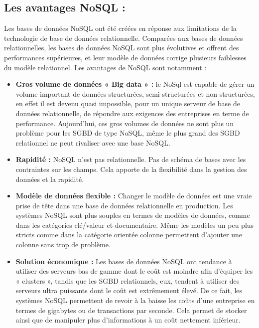 \subsection{Les avantages NoSQL : }
Les bases de données NoSQL ont été créées en réponse aux limitations de la technologie de base de données relationnelle. Comparées aux bases de données relationnelles, les bases de données NoSQL sont plus évolutives et offrent des performances supérieures, et leur modèle de données corrige plusieurs faiblesses du modèle relationnel. Les avantages de NoSQL sont notamment :

\begin{itemize}
\item \textbf{Gros volume de données « Big data » :} le NoSql est capable de gérer un volume important de données structurées, semi-structurées et non structurées, en effet il est devenu quasi impossible, pour un unique serveur de base de données relationnelle, de répondre aux exigences des entreprises en terme de performance. Aujourd’hui, ces gros volumes de données ne sont plus un problème pour les SGBD de type NoSQL, même le plus grand des SGBD relationnel ne peut rivaliser avec une base NoSQL.

\item \textbf{Rapidité :} NoSQL n'est pas relationnelle. Pas de schéma de bases avec les contraintes sur les champs. Cela apporte de la flexibilité dans la gestion des données et la rapidité.

\item \textbf{Modèle de données flexible :} Changer le modèle de données est une vraie prise de tête dans une base de données relationnelle en production. Les systèmes NoSQL sont plus souples en termes de modèles de données, comme dans les catégories clé/valeur et documentaire. Même les modèles un peu plus stricts comme dans la catégorie orientée colonne permettent d’ajouter une colonne sans trop de problème.

\item \textbf{Solution économique :} Les bases de données NoSQL ont tendance à utiliser des serveurs bas de gamme dont le coût est moindre afin d’équiper les « clusters », tandis que les SGBD relationnels, eux, tendent à utiliser des serveurs ultra puissants dont le coût est extrêmement élevé. De ce fait, les systèmes NoSQL permettent de revoir à la baisse les coûts d’une entreprise en termes de gigabytes ou de transactions par seconde. Cela permet de stocker ainsi que de manipuler plus d’informations à un coût nettement inférieur.
\end{itemize}
